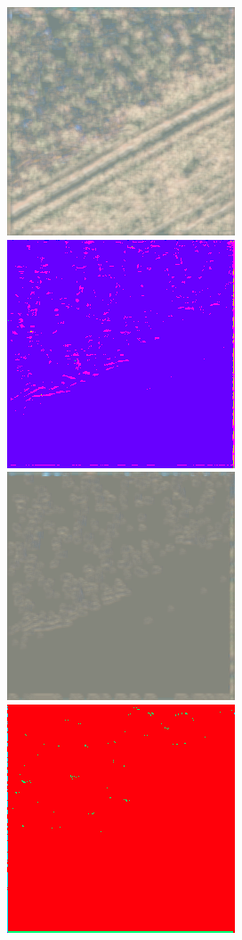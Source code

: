 \begin{figure}
    \includegraphics[width=\WnetPredictionsImageWidth]{images/wnet/46d-6/19743-restored} \hfill
    \includegraphics[width=\WnetPredictionsImageWidth]{images/wnet/36d-20/19743-prediction} \hfill
    \includegraphics[width=\WnetPredictionsImageWidth]{images/wnet/36d-20/19743-restored} \hfill
    \includegraphics[width=\WnetPredictionsImageWidth]{images/wnet/46d-20/19743-prediction} \hfill

\end{figure}
